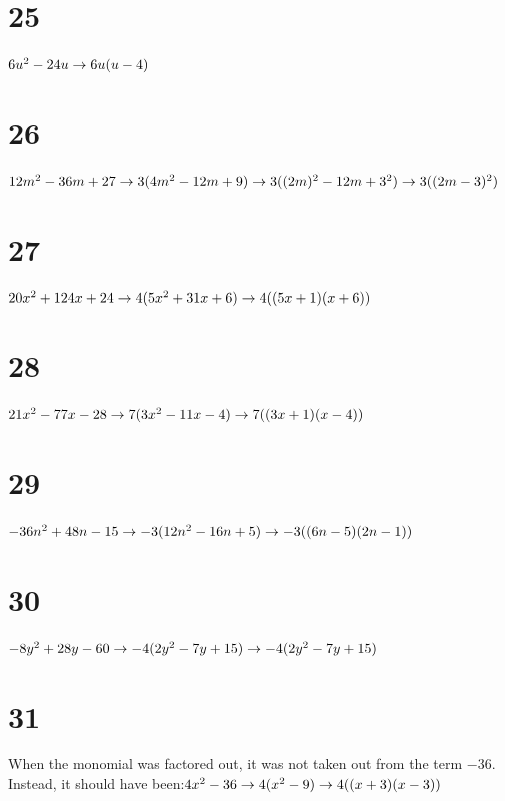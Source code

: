 \documentclass{article}
\theoremstyle{definition}
\begin{document}
\section*{25}
$6u^2-24u\newline\rightarrow 6u(u-4)$

\section*{26}
$12m^2-36m+27\newline\rightarrow 3(4m^2-12m+9)\newline\rightarrow 3((2m)^2-12m+3^2)\newline\rightarrow 3((2m-3)^2)$

\section*{27}
$20x^2+124x+24\newline\rightarrow 4(5x^2+31x+6)\newline\rightarrow 4((5x+1)(x+6))$

\section*{28}
$21x^2-77x-28\newline\rightarrow 7(3x^2-11x-4)\newline\rightarrow 7((3x+1)(x-4))$

\section*{29}
$-36n^2+48n-15\newline\rightarrow -3(12n^2-16n+5)\newline\rightarrow -3((6n-5)(2n-1))$

\section*{30}
$-8y^2+28y-60\newline\rightarrow -4(2y^2-7y+15)\newline\rightarrow -4(2y^2-7y+15)$

\section*{31}
When the monomial was factored out, it was not taken out from the term $-36$. Instead, it should have been:\newline$4x^2-36\newline\rightarrow 
4(x^2-9)\newline\rightarrow 4((x+3)(x-3))$
\end{document}
